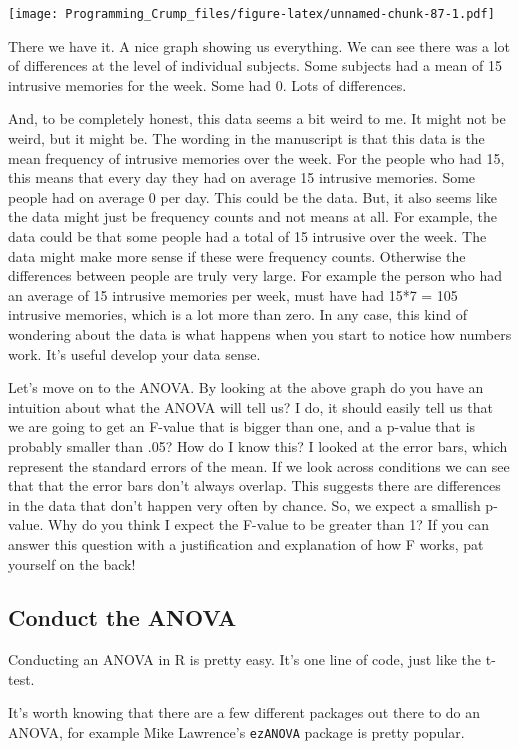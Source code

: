 \documentclass[]{book}
\theoremstyle{definition}
\theoremstyle{definition}
\theoremstyle{definition}
\theoremstyle{remark}
\begin{document}
\texttt{[image: Programming\_Crump\_files/figure-latex/unnamed-chunk-87-1.pdf]}

There we have it. A nice graph showing us everything. We can see there
was a lot of differences at the level of individual subjects. Some
subjects had a mean of 15 intrusive memories for the week. Some had 0.
Lots of differences.

And, to be completely honest, this data seems a bit weird to me. It
might not be weird, but it might be. The wording in the manuscript is
that this data is the mean frequency of intrusive memories over the
week. For the people who had 15, this means that every day they had on
average 15 intrusive memories. Some people had on average 0 per day.
This could be the data. But, it also seems like the data might just be
frequency counts and not means at all. For example, the data could be
that some people had a total of 15 intrusive over the week. The data
might make more sense if these were frequency counts. Otherwise the
differences between people are truly very large. For example the person
who had an average of 15 intrusive memories per week, must have had 15*7
= 105 intrusive memories, which is a lot more than zero. In any case,
this kind of wondering about the data is what happens when you start to
notice how numbers work. It's useful develop your data sense.

Let's move on to the ANOVA. By looking at the above graph do you have an
intuition about what the ANOVA will tell us? I do, it should easily tell
us that we are going to get an F-value that is bigger than one, and a
p-value that is probably smaller than .05? How do I know this? I looked
at the error bars, which represent the standard errors of the mean. If
we look across conditions we can see that that the error bars don't
always overlap. This suggests there are differences in the data that
don't happen very often by chance. So, we expect a smallish p-value. Why
do you think I expect the F-value to be greater than 1? If you can
answer this question with a justification and explanation of how F
works, pat yourself on the back!

\subsection{Conduct the ANOVA}\label{conduct-the-anova}

Conducting an ANOVA in R is pretty easy. It's one line of code, just
like the t-test.

It's worth knowing that there are a few different packages out there to
do an ANOVA, for example Mike Lawrence's \texttt{ezANOVA} package is
pretty popular.
\end{document}
